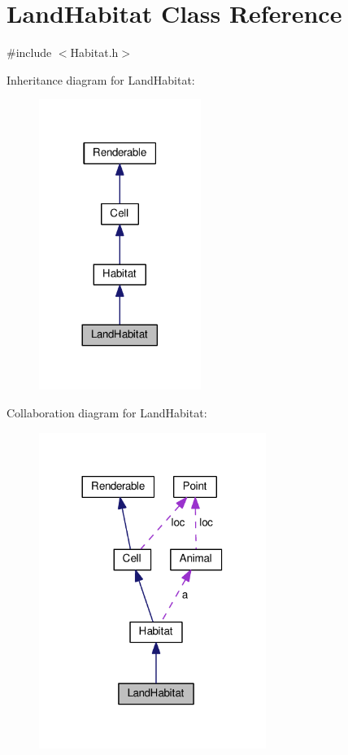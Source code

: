 \hypertarget{classLandHabitat}{}\section{Land\+Habitat Class Reference}
\label{classLandHabitat}


{\ttfamily \#include $<$Habitat.\+h$>$}



Inheritance diagram for Land\+Habitat\+:
\nopagebreak
\begin{figure}[H]
\begin{center}
\leavevmode
\includegraphics[width=149pt]{classLandHabitat__inherit__graph}
\end{center}
\end{figure}


Collaboration diagram for Land\+Habitat\+:
\nopagebreak
\begin{figure}[H]
\begin{center}
\leavevmode
\includegraphics[width=209pt]{classLandHabitat__coll__graph}
\end{center}
\end{figure}
